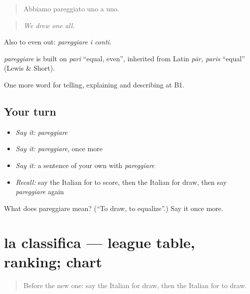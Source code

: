 \begin{quote}
Abbiamo pareggiato uno a uno.
\end{quote}

\begin{quote}
\emph{We drew one all.}
\end{quote}

Also to even out: \emph{pareggiare i conti}.

\begin{cousinweb}
\emph{pareggiare} is built on \emph{pari} \textquotedblleft{}equal, even\textquotedblright{}, inherited from Latin \emph{pār, paris} \textquotedblleft{}equal\textquotedblright{} (Lewis \& Short).
\end{cousinweb}

\begin{grammarlens}[title={What you've built}]
One more word for telling, explaining and describing at B1.
\end{grammarlens}

\subsection*{Your turn}
\begin{itemize}
\raggedright
  \item \emph{Say it:} \emph{pareggiare}
  \item \emph{Say it:} \emph{pareggiare}, once more
  \item \emph{Say it:} a sentence of your own with \emph{pareggiare}
  \item \emph{Recall:} say the Italian for to score, then the Italian for draw, then say \emph{pareggiare} again
\end{itemize}

\begin{tcolorbox}[breakable,colback=teal!4,colframe=teal!35!black,title={Before you move on}]
What does pareggiare mean? (\textquotedblleft{}To draw, to equalize\textquotedblright{}.) Say it once more.
\end{tcolorbox}
\section[la classifica]{la classifica — league table, ranking; chart}

\label{lesson:IT-C511-classifica}



\begin{quote}
Before the new one: say the Italian for draw, then the Italian for to draw.
\end{quote}

